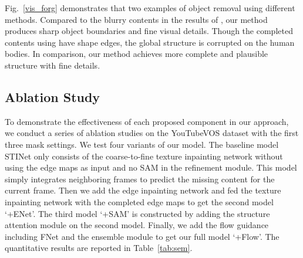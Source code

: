 

%
Fig.~\ref{vis_forg} demonstrates that two examples of object removal using different methods. 
Compared to the blurry contents in the results of \cite{nazeri2019edgeconnect,wang2019video,Kim_2019_CVPR1}, our method produces sharp object boundaries and fine visual details. 
Though the completed contents using \cite{Xu_2019_CVPR} have shape edges, the global structure is corrupted on the human bodies. In comparison, our method achieves more complete and plausible structure with fine details.



\begin{table}[t]
	\caption{The result of user study. }\smallskip
	\tiny
	\centering
	\label{tab:userstudy}
\end{table}




\subsection{Ablation Study}
To demonstrate the effectiveness of each proposed component in our approach, we conduct a series of ablation studies on the YouTubeVOS dataset with the first three mask settings. 
%
We test four variants of our model. 
The baseline model STINet only consists of the coarse-to-fine texture inpainting network without using the edge maps as input and no SAM in the refinement module.
This model simply integrates neighboring frames to predict the missing content for the current frame.
%
Then we add the edge inpainting network and fed the texture inpainting network with the completed edge maps to get the second model `+ENet'.
The third model `+SAM' is constructed by adding the structure attention module on the second model. 
Finally, we add the flow guidance including FNet and the ensemble module to get our full model `+Flow'.
The quantitative results are reported in Table~\ref{tab:sem}. 


